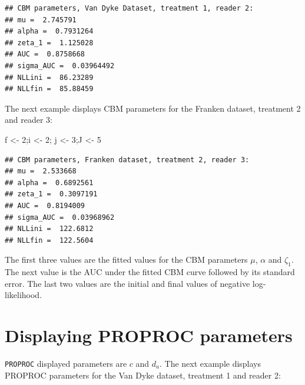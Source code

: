 \documentclass[
]{book}
\newenvironment{Shaded}{\begin{snugshade}}{\end{snugshade}}
\newcommand{\DecValTok}[1]{\textcolor[rgb]{0.00,0.00,0.81}{#1}}
\newcommand{\NormalTok}[1]{#1}
\newcommand{\OtherTok}[1]{\textcolor[rgb]{0.56,0.35,0.01}{#1}}
\begin{document}
\begin{verbatim}
## CBM parameters, Van Dyke Dataset, treatment 1, reader 2: 
## mu =  2.745791 
## alpha =  0.7931264 
## zeta_1 =  1.125028 
## AUC =  0.8758668 
## sigma_AUC =  0.03964492 
## NLLini =  86.23289 
## NLLfin =  85.88459
\end{verbatim}

The next example displays CBM parameters for the Franken dataset, treatment 2 and reader 3:

\begin{Shaded}
\begin{Highlighting}[]
\NormalTok{f }\OtherTok{\textless{}{-}} \DecValTok{2}\NormalTok{;i }\OtherTok{\textless{}{-}} \DecValTok{2}\NormalTok{; j }\OtherTok{\textless{}{-}} \DecValTok{3}\NormalTok{;J }\OtherTok{\textless{}{-}} \DecValTok{5}
\end{Highlighting}
\end{Shaded}

\begin{verbatim}
## CBM parameters, Franken dataset, treatment 2, reader 3: 
## mu =  2.533668 
## alpha =  0.6892561 
## zeta_1 =  0.3097191 
## AUC =  0.8194009 
## sigma_AUC =  0.03968962 
## NLLini =  122.6812 
## NLLfin =  122.5604
\end{verbatim}

The first three values are the fitted values for the CBM parameters \(\mu\), \(\alpha\) and \(\zeta_1\). The next value is the AUC under the fitted CBM curve followed by its standard error. The last two values are the initial and final values of negative log-likelihood.

\hypertarget{rsm-3-fits-proproc-parameters}{%
\section{Displaying PROPROC parameters}\label{rsm-3-fits-proproc-parameters}}

\texttt{PROPROC} displayed parameters are \(c\) and \(d_a\). The next example displays PROPROC parameters for the Van Dyke dataset, treatment 1 and reader 2:
\end{document}
